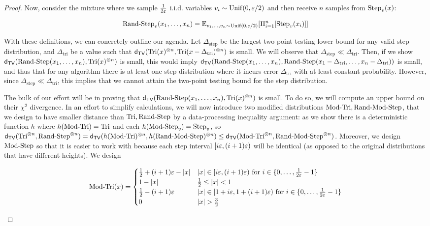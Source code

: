 \begin{proof}
Now, consider the mixture where we sample $\frac{1}{2\varepsilon}$ i.i.d. variables $v_i \sim \operatorname{Unif}(0,\varepsilon/2)$ and then receive $n$ samples from $\operatorname{Step}_v(x)$:

\begin{definition}
\begin{align*}
    \operatorname{Rand-Step}_v(x_1,\dots,x_n) = \mathbb{E}_{v_1,\dots,v_n \sim \operatorname{Unif}(0,\varepsilon/2)}[\Pi_{i=1}^n[\operatorname{Step}_v(x_i)]]
\end{align*}
\end{definition}

With these definitions, we can concretely outline our agenda. Let $\Delta_{\textrm{step}}$ be the largest two-point testing lower bound for any valid step distribution, and $\Delta_{\textrm{tri}}$ be a value such that $\mathsf{d_{TV}}(\operatorname{Tri}(x)^{\otimes n},\operatorname{Tri}(x-\Delta_{\textrm{tri}})^{\otimes n})$ is small. We will observe that $\Delta_{\textrm{step}} \ll \Delta_{\textrm{tri}}$. Then, if we show $\mathsf{d_{TV}}(\operatorname{Rand-Step}(x_1,\dots,x_n),\operatorname{Tri}(x)^{\otimes n})$ is small, this would imply $\mathsf{d_{TV}}(\operatorname{Rand-Step}(x_1,\dots,x_n),\operatorname{Rand-Step}(x_1-\Delta_{\textrm{tri}},\dots,x_n-\Delta_{\textrm{tri}}))$ is small, and thus that for any algorithm there is at least one step distribution where it incurs error $\Delta_{\textrm{tri}}$ with at least constant probability. However, since $\Delta_{\textrm{step}} \ll \Delta_{\textrm{tri}}$, this implies that we cannot attain the two-point testing bound for the step distribution.

The bulk of our effort will be in proving that $\mathsf{d_{TV}}(\operatorname{Rand-Step}(x_1,\dots,x_n),\operatorname{Tri}(x)^{\otimes n})$ is small. To do so, we will compute an upper bound on their $\chi^2$ divergence. In an effort to simplify calculations, we will now introduce two modified distributions $\operatorname{Mod-Tri},\operatorname{Rand-Mod-Step}$, that we design to have smaller distance than $\operatorname{Tri},\operatorname{Rand-Step}$ by a data-processing inequality argument: as we show there is a deterministic function $h$ where $h(\operatorname{Mod-Tri})=\operatorname{Tri}$ and each $h(\operatorname{Mod-Step}_v)=\operatorname{Step}_v$, so $\mathsf{d_{TV}}(\operatorname{Tri}^{\otimes n},\operatorname{Rand-Step}^{\otimes n}) = \mathsf{d_{TV}}(h(\operatorname{Mod-Tri})^{\otimes n},h(\operatorname{Rand-Mod-Step})^{\otimes n}) \le \mathsf{d_{TV}}(\operatorname{Mod-Tri}^{\otimes n},\operatorname{Rand-Mod-Step}^{\otimes n})$. Moreover, we design $\operatorname{Mod-Step}$ so that it is easier to work with because each step interval $[i\varepsilon,(i+1)\varepsilon)$ will be identical (as opposed to the original distributions that have different heights). We design

\begin{definition}

       \begin{align*}
     \mtri(x) = \begin{cases} 
          \frac{1}{2} + (i+1)\eps - |x| & |x| \in [i\eps,(i+1)\eps) \textrm{ for } i \in \{0,\dots,\frac{1}{2\eps}-1\}\\
          1-|x| & \frac{1}{2} \le |x| < 1 \\
          \frac{1}{2}-(i+1)\eps & |x| \in [1+i\eps,1+(i+1)\eps) \textrm{ for } i \in \{0,\dots,\frac{1}{2\eps}-1\}\\
          0 & |x|>\frac{3}{2}
       \end{cases}
    \end{align*}
\end{definition}


\end{proof}
